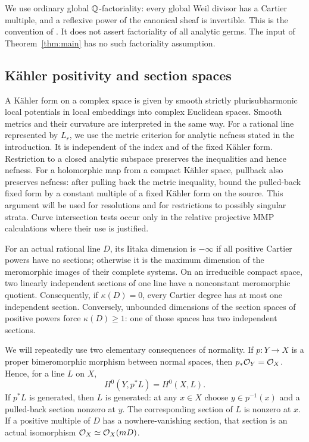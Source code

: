 We use ordinary global \(\mathbb Q\)-factoriality: every global Weil divisor has
a Cartier multiple, and a reflexive power of the canonical sheaf is
invertible.  This is the convention of
\cite[Definition~2.7]{DasHaconPaun2024}.  It does not assert factoriality
of all analytic germs.  The input of Theorem~\ref{thm:main} has no such
factoriality assumption.

\subsection{K\"ahler positivity and section spaces}

A K\"ahler form on a complex space is given by smooth strictly
plurisubharmonic local potentials in local embeddings into complex
Euclidean spaces.  Smooth metrics and their curvature are interpreted
in the same way.  For a rational line represented by \(L_r\), we use the
metric criterion for analytic nefness stated in the introduction.  It is
independent of the index and of the fixed K\"ahler form.  Restriction to a
closed analytic subspace preserves the inequalities and hence nefness.
For a holomorphic map from a compact K\"ahler space, pullback also preserves
nefness: after pulling back the metric inequality, bound the pulled-back
fixed form by a constant multiple of a fixed K\"ahler form on the source.
This argument will be used for resolutions and for restrictions to
possibly singular strata.  Curve intersection tests occur only in the
relative projective MMP calculations where their use is justified.

For an actual rational line \(D\), its Iitaka dimension is \(-\infty\)
if all positive Cartier powers have no sections; otherwise it is the
maximum dimension of the meromorphic images of their complete systems.
On an irreducible compact space, two linearly independent sections of one
line have a nonconstant meromorphic quotient.  Consequently, if
\(\kappa(D)=0\), every Cartier degree has at most one independent section.
Conversely, unbounded dimensions of the section spaces of positive powers
force \(\kappa(D)\geq1\): one of those spaces has two independent sections.

We will repeatedly use two elementary consequences of normality.  If
\(p:Y\to X\) is a proper bimeromorphic morphism between normal spaces, then
\(p_*\mathcal O_Y=\mathcal O_X\).  Hence, for a line \(L\) on \(X\),
\[
 H^0(Y,p^*L)=H^0(X,L).
\]
If \(p^*L\) is generated, then \(L\) is generated: at any \(x\in X\)
choose \(y\in p^{-1}(x)\) and a pulled-back section nonzero at \(y\).
The corresponding section of \(L\) is nonzero at \(x\).  If a positive
multiple of \(D\) has a nowhere-vanishing section, that section is an
actual isomorphism \(\mathcal O_X\simeq\mathcal O_X(mD)\).

